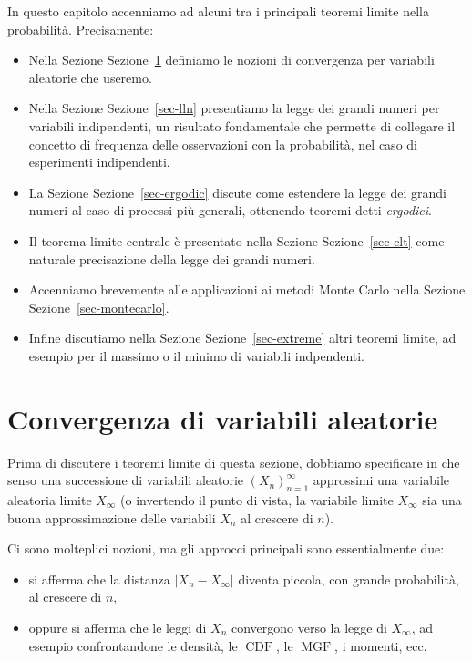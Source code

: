 \documentclass[
  italian,
  letterpaper,
]{book}
\providecommand{\tightlist}{%
  \setlength{\itemsep}{0pt}\setlength{\parskip}{0pt}}
\newcommand{\CDF}{\operatorname{CDF}}
\newcommand{\MGF}{\operatorname{MGF}}
\theoremstyle{definition}
\theoremstyle{remark}
\begin{document}
In questo capitolo accenniamo ad alcuni tra i principali teoremi limite
nella probabilità. Precisamente:

\begin{itemize}
\item
  Nella Sezione Sezione~\ref{sec-convergenze} definiamo le nozioni di
  convergenza per variabili aleatorie che useremo.
\item
  Nella Sezione Sezione~\ref{sec-lln} presentiamo la legge dei grandi
  numeri per variabili indipendenti, un risultato fondamentale che
  permette di collegare il concetto di frequenza delle osservazioni con
  la probabilità, nel caso di esperimenti indipendenti.
\item
  La Sezione Sezione~\ref{sec-ergodic} discute come estendere la legge
  dei grandi numeri al caso di processi più generali, ottenendo teoremi
  detti \emph{ergodici}.
\item
  Il teorema limite centrale è presentato nella Sezione
  Sezione~\ref{sec-clt} come naturale precisazione della legge dei
  grandi numeri.
\item
  Accenniamo brevemente alle applicazioni ai metodi Monte Carlo nella
  Sezione Sezione~\ref{sec-montecarlo}.
\item
  Infine discutiamo nella Sezione Sezione~\ref{sec-extreme} altri
  teoremi limite, ad esempio per il massimo o il minimo di variabili
  indpendenti.
\end{itemize}

\section{Convergenza di variabili aleatorie}\label{sec-convergenze}

Prima di discutere i teoremi limite di questa sezione, dobbiamo
specificare in che senso una successione di variabili aleatorie
\((X_n)_{n=1}^\infty\) approssimi una variabile aleatoria limite
\(X_\infty\) (o invertendo il punto di vista, la variabile limite
\(X_\infty\) sia una buona approssimazione delle variabili \(X_n\) al
crescere di \(n\)).

Ci sono molteplici nozioni, ma gli approcci principali sono
essentialmente due:

\begin{itemize}
\tightlist
\item
  si afferma che la distanza \(|X_n - X_\infty|\) diventa piccola, con
  grande probabilità, al crescere di \(n\),
\item
  oppure si afferma che le leggi di \(X_n\) convergono verso la legge di
  \(X_\infty\), ad esempio confrontandone le densità, le \(\CDF\), le
  \(\MGF\), i momenti, ecc.
\end{itemize}
\end{document}
